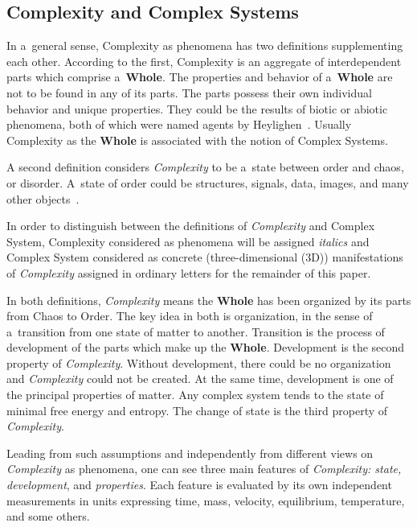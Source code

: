\begin{multicols}{2}
{}


\section*{Complexity and Complex Systems}

\noindent
In a~general sense, Complexity as phenomena has two definitions supplementing each other. 
According to the first, Complexity is an aggregate of interdependent parts which comprise 
a~\textbf{Whole}. The properties and behavior of a~\textbf{Whole} are not to be found in any 
of its parts. The parts possess their own individual behavior and unique properties. They could 
be the results of biotic or abiotic phenomena, both of which were named 
agents by Heylighen~\cite{7-sel}. 
Usually Complexity as the \textbf{Whole} is associated with the notion of Complex Systems. 

 A second definition considers \textit{Complexity} to be a~state between order and chaos,
 or disorder. A~state 
of order could be structures, signals, data, images, and many other objects~\cite{6-sel}. 

In order to distinguish between the definitions of \textit{Complexity} and Complex System, 
Complexity considered as phenomena will be assigned \textit{italics} and Complex System 
considered as concrete (three-dimensional (3D)) manifestations of \textit{Complexity} assigned in 
ordinary letters for the remainder of this paper. 

In both definitions, \textit{Complexity} means the \textbf{Whole} has been organized by its parts 
from Chaos to Order. The key idea in both is organization, in the sense of a~transition from one 
state of matter to another. Transition is the process of development of the parts 
which make up the \textbf{Whole}. Development is the second property of \textit{Complexity}. 
Without development, there could be no organization and \textit{Complexity} could not be 
created. At the same time, development is one of the principal properties of matter. Any complex 
system tends to the state of minimal free energy and entropy. The change of state is the
third  property of \textit{Complexity}.

Leading from such assumptions and independently from different views on \textit{Complexity} 
as phenomena, one can see three main features of \textit{Complexity: state, development}, and 
\textit{properties}. Each feature is evaluated by its own independent measurements in units 
expressing time, mass, velocity, equilibrium, temperature, and some others. 


\end{multicols}
